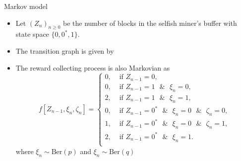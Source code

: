 \documentclass{beamer}
\begin{document}
\begin{frame}{Markov model}
\scriptsize
\begin{itemize}
\item Let $(Z_n)_{n\geq0}$ be the number of blocks in the selfish miner's buffer with state space $\{0, 0^\ast, 1\}$. 

\item The transition graph is given by
\begin{center}
\end{center}
\item The reward collecting process is also Markovian as
\begin{equation*}
f\left[Z_{n-1}, \xi_n,\zeta_{n}\right] = \begin{cases}
0,&\text{ if } Z_{n-1} =0,\\
0,&\text{ if } Z_{n-1} =1\text{ }\&\text{ }\xi_{n} =0,\\
2,&\text{ if } Z_{n-1} =1\text{ }\&\text{ }\xi_{n} =1,\\
0,&\text{ if } Z_{n-1} =0^\ast \text{ }\&\text{ }\xi_{n} = 0\text{ }\&\text{ }\zeta_{n} = 0,\\
1,&\text{ if } Z_{n-1} =0^\ast \text{ }\&\text{ }\xi_{n} = 0\text{ }\&\text{ }\zeta_{n} = 1,\\
2,&\text{ if }Z_{n-1} = 0^\ast \text{ }\&\text{ }\xi_{n} = 1.\\
\end{cases}
\end{equation*}
where $\xi_n\sim\text{Ber}(p)$ and $\xi_n\sim\text{Ber}(q)$
\end{itemize}
\end{frame}
\end{document}
